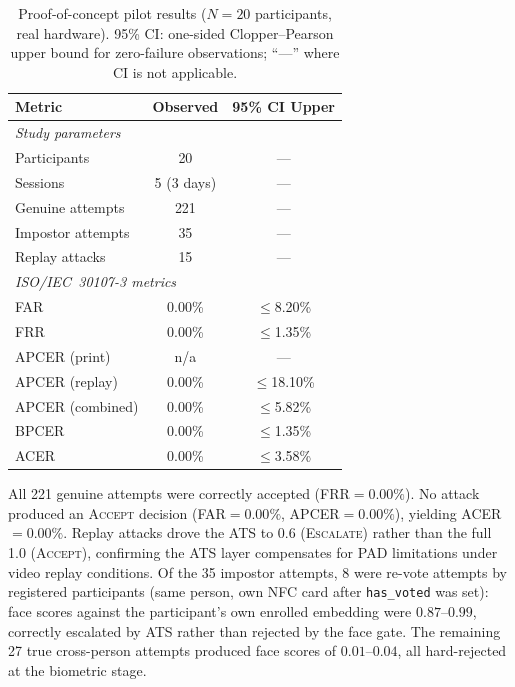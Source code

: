\documentclass[pdflatex,sn-vancouver-num]{sn-jnl}%
\theoremstyle{thmstyleone}%
\theoremstyle{thmstyletwo}%
\theoremstyle{thmstylethree}%
\begin{document}
\begin{table}[t]
\caption{Proof-of-concept pilot results (\(N{=}20\) participants, real
  hardware). 95\% CI: one-sided Clopper--Pearson upper bound for zero-failure
  observations; ``---'' where CI is not applicable.}
\label{tab:pilot}%
\begin{tabular}{|l|c|c|}
  \hline
  Metric & Observed & 95\% CI Upper \\
  \hline
  \multicolumn{3}{|l|}{\textit{Study parameters}} \\
  \quad Participants       & 20          & --- \\
  \quad Sessions           & 5 (3 days)  & --- \\
  \quad Genuine attempts   & 221         & --- \\
  \quad Impostor attempts  & 35          & --- \\
  \quad Replay attacks     & 15          & --- \\
  \hline
  \multicolumn{3}{|l|}{\textit{ISO/IEC~30107-3 metrics}} \\
  \quad FAR                & 0.00\%  & \(\leq\)8.20\% \\
  \quad FRR                & 0.00\%  & \(\leq\)1.35\% \\
  \quad APCER (print)      & n/a     & --- \\
  \quad APCER (replay)     & 0.00\%  & \(\leq\)18.10\% \\
  \quad APCER (combined)   & 0.00\%  & \(\leq\)5.82\% \\
  \quad BPCER              & 0.00\%  & \(\leq\)1.35\% \\
  \quad ACER               & 0.00\%  & \(\leq\)3.58\% \\
  \hline
\end{tabular}
\end{table}

All 221 genuine attempts were correctly accepted (FRR\(=0.00\%\)). No attack
produced an \textsc{Accept} decision (FAR\(=0.00\%\), APCER\(=0.00\%\)),
yielding ACER\(=0.00\%\). Replay attacks drove the ATS to 0.6
(\textsc{Escalate}) rather than the full 1.0 (\textsc{Accept}), confirming the
ATS layer compensates for PAD limitations under video replay conditions. Of the
35 impostor attempts, 8 were re-vote attempts by registered participants (same
person, own NFC card after \texttt{has\_voted} was set): face scores against
the participant's own enrolled embedding were \(0.87\)--\(0.99\), correctly
escalated by ATS rather than rejected by the face gate. The remaining 27 true
cross-person attempts produced face scores of \(0.01\)--\(0.04\), all
hard-rejected at the biometric stage.
\end{document}
